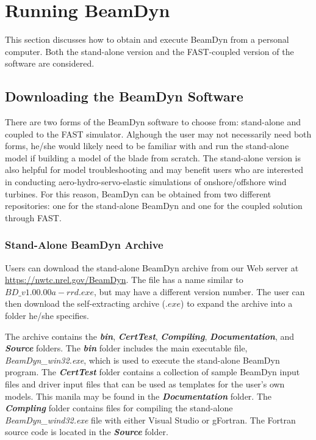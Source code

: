 \chapter{Running BeamDyn}
\label{sec:Run}
This section discusses how to obtain and execute BeamDyn from a personal computer. Both the stand-alone version and the FAST-coupled version of the software are considered.

\section{Downloading the BeamDyn Software}
There are two forms of the BeamDyn software to choose from: stand-alone and coupled to the FAST simulator. Alghough the user may not necessarily need both forms, he/she would likely need to be familiar with and run the stand-alone model if building a model of the blade from scratch. The stand-alone version is also helpful for model troubleshooting and may benefit users who are interested in conducting aero-hydro-servo-elastic simulations of onshore/offshore wind turbines. For this reason, BeamDyn can be obtained from two different repositories: one for the stand-alone BeamDyn and one for the coupled solution through FAST.

\subsection{Stand-Alone BeamDyn Archive}
Users can download the stand-alone BeamDyn archive from our Web server at \url{https://nwtc.nrel.gov/BeamDyn}. The file has a name similar to $BD\_v1.00.00a-rrd.exe$, but may have a different version number. The user can then download the self-extracting archive ($.exe$) to expand the archive into a folder he/she specifies.

The archive contains the \textbf{\textit{bin}}, \textbf{\textit{CertTest}}, \textbf{\textit{Compiling}}, \textbf{\textit{Documentation}}, and \textbf{\textit{Source}} folders. The \textbf{\textit{bin}} folder includes the main executable file, \textit{BeamDyn\_win32.exe}, which is used to execute the stand-alone BeamDyn program. The \textbf{\textit{CertTest}} folder contains a collection of sample BeamDyn input files and driver input files that can be used as templates for the user's own models. This manila may be found in the \textbf{\textit{Documentation}} folder. The \textbf{\textit{Compling}} folder contains files for compiling the stand-alone \textit{BeamDyn\_wind32.exe} file with either Visual Studio or gFortran. The Fortran source code is located in the \textbf{\textit{Source}} folder.

